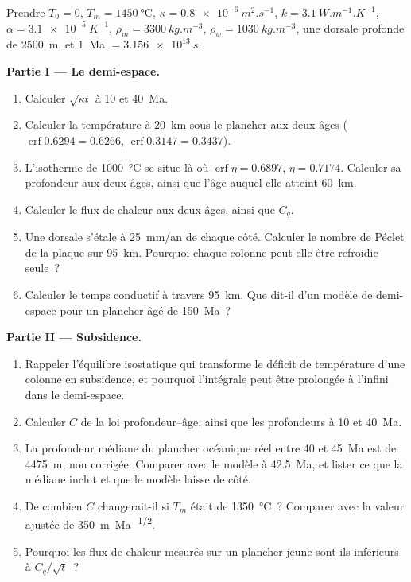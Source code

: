 \begin{problem}
\label{pb:b3:lithosphere-thermal-models:1}
Prendre $T_0 = 0$, $T_m = \qty{1450}{\celsius}$, $\kappa =
\qty{0.8e-6}{m^2.s^{-1}}$, $k = \qty{3.1}{W.m^{-1}.K^{-1}}$, $\alpha =
\qty{3.1e-5}{K^{-1}}$, $\rho_m = \qty{3300}{kg.m^{-3}}$, $\rho_w =
\qty{1030}{kg.m^{-3}}$, une dorsale profonde de \qty{2500}{m}, et \qty{1}{Ma} $=
\qty{3.156e13}{s}$.

\medskip\noindent\textbf{Partie I --- Le demi-espace.}
\begin{enumerate}
  \item Calculer $\sqrt{\kappa t}$ à 10 et \qty{40}{Ma}.
  \item Calculer la température à \qty{20}{km} sous le plancher aux deux âges
        ($\operatorname{erf}0.6294 = 0.6266$, $\operatorname{erf}0.3147 =
        0.3437$).
  \item L'isotherme de \qty{1000}{\celsius} se situe là où $\operatorname{erf}\eta =
        0.6897$, $\eta = 0.7174$. Calculer sa profondeur aux deux âges, ainsi que l'âge
        auquel elle atteint \qty{60}{km}.
  \item Calculer le flux de chaleur aux deux âges, ainsi que $C_q$.
  \item Une dorsale s'étale à \qty{25}{mm/an} de chaque côté. Calculer le nombre de Péclet
        de la plaque sur \qty{95}{km}. Pourquoi chaque colonne peut-elle être
        refroidie seule~?
  \item Calculer le temps conductif à travers \qty{95}{km}. Que dit-il d'un
        modèle de demi-espace pour un plancher âgé de \qty{150}{Ma}~?
\end{enumerate}

\medskip\noindent\textbf{Partie II --- Subsidence.}
\begin{enumerate}[resume]
  \item Rappeler l'équilibre isostatique qui transforme le déficit de température
        d'une colonne en subsidence, et pourquoi l'intégrale peut être prolongée à l'infini
        dans le demi-espace.
  \item Calculer $C$ de la loi profondeur--âge, ainsi que les profondeurs à 10 et
        \qty{40}{Ma}.
  \item La profondeur médiane du plancher océanique réel entre 40 et \qty{45}{Ma}
        est de \qty{4475}{m}, non corrigée. Comparer avec le modèle à
        \qty{42.5}{Ma}, et lister ce que la médiane inclut et que le modèle
        laisse de côté.
  \item De combien $C$ changerait-il si $T_m$ était de \qty{1350}{\celsius}~?
        Comparer avec la valeur ajustée de \qty{350}{m.Ma^{-1/2}}.
  \item Pourquoi les flux de chaleur mesurés sur un plancher jeune sont-ils inférieurs à $C_q/\sqrt t$~?
\end{enumerate}


\end{problem}
